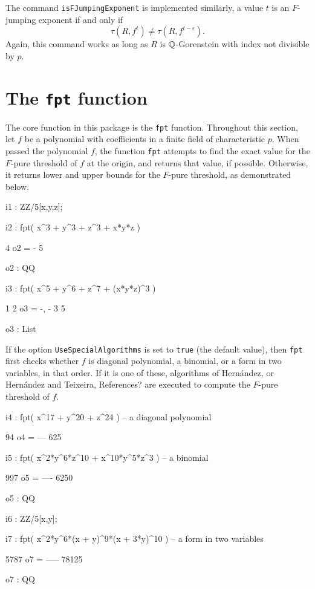 \documentclass{amsart}
\begin{document}
The command {\tt isFJumpingExponent} is implemented similarly, a value $t$ is an $F$-jumping exponent if and only if
\[
\tau(R, f^t) \neq \tau(R, f^{t-\epsilon}).  
\]
Again, this command works as long as $R$ is $\mathbb{Q}$-Gorenstein with index not divisible by $p$. 


\newpage
\section{The {\tt fpt} function}
\label{sec.FPT}

The core function in this package is the {\tt fpt} function.  Throughout this section, let $f$ be a polynomial with coefficients in a finite field of characteristic $p$. When passed the polynomial $f$, the function {\tt fpt} attempts to find the exact value for the $F$-pure threshold of $f$ at the origin, and returns that value, if possible.  Otherwise, it returns lower and upper bounds for the $F$-pure threshold, as demonstrated below.
     
{\small
{}
\begin{MyVerbatim}

i1 : ZZ/5[x,y,z];

i2 : fpt( x^3 + y^3 + z^3 + x*y*z )

     4
o2 = -
     5

o2 : QQ

i3 : fpt( x^5 + y^6 + z^7 + (x*y*z)^3 )

      1  2
o3 = {-, -}
      3  5

o3 : List

\end{MyVerbatim}
}
            
             If the option {\tt UseSpecialAlgorithms} is set to {\tt true} (the default value), then {\tt fpt} first checks whether $f$ is diagonal polynomial, a binomial, or a form in two variables, in that order.
             If it is one of these, algorithms of Hern\'andez, or Hern\'andez and Teixeira, {\color{red}  References?} are executed to compute the $F$-pure threshold of $f$.

{\small
{}
\begin{MyVerbatim}

i4 : fpt( x^17 + y^20 + z^24 ) -- a diagonal polynomial

      94
o4 = ---
     625
     
i5 : fpt( x^2*y^6*z^10 + x^10*y^5*z^3 ) -- a binomial

      997
o5 = ----
     6250

o5 : QQ     

i6 : ZZ/5[x,y];

i7 : fpt( x^2*y^6*(x + y)^9*(x + 3*y)^10 ) -- a form in two variables

      5787
o7 = -----
     78125

o7 : QQ

\end{MyVerbatim}
}
       
\end{document}
